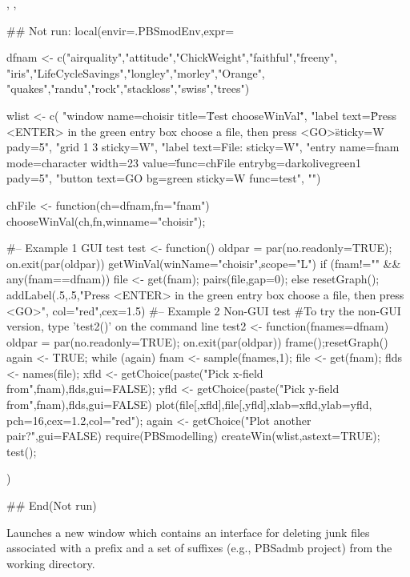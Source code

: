 \documentclass[letterpaper]{book}
\begin{document}
%
\begin{SeeAlso}\relax
 
, , 
\end{SeeAlso}
%
\begin{Examples}
\begin{ExampleCode}
## Not run: 
local(envir=.PBSmodEnv,expr={
dfnam <-
  c("airquality","attitude","ChickWeight","faithful","freeny",
  "iris","LifeCycleSavings","longley","morley","Orange",
  "quakes","randu","rock","stackloss","swiss","trees")

wlist <- c(
  "window name=choisir title=\"Test chooseWinVal\"",
  "label text=\"Press <ENTER> in the green entry box
  \nto choose a file, then press <GO>\" sticky=W pady=5",
  "grid 1 3 sticky=W",
  "label text=File: sticky=W",
  "entry name=fnam mode=character width=23 value=\"\" 
  func=chFile entrybg=darkolivegreen1 pady=5",
  "button text=GO bg=green sticky=W func=test",
  "")

chFile <- function(ch=dfnam,fn="fnam") 
  {chooseWinVal(ch,fn,winname="choisir")};

#-- Example 1 GUI test
test <- function() {
  oldpar = par(no.readonly=TRUE); on.exit(par(oldpar))
  getWinVal(winName="choisir",scope="L")
  if (fnam!="" && any(fnam==dfnam)) {
    file <- get(fnam);
    pairs(file,gap=0); }
  else {
    resetGraph(); 
    addLabel(.5,.5,"Press <ENTER> in the green entry box
    \nto choose a file, then press <GO>", col="red",cex=1.5)
  }
}
#-- Example 2 Non-GUI test
#To try the non-GUI version, type 'test2()' on the command line
test2 <- function(fnames=dfnam) {
  oldpar = par(no.readonly=TRUE); on.exit(par(oldpar))
  frame();resetGraph()
  again <- TRUE;
  while (again) {
    fnam <- sample(fnames,1); file <- get(fnam); 
    flds <- names(file);
    xfld <- getChoice(paste("Pick x-field from",fnam),flds,gui=FALSE);
    yfld <- getChoice(paste("Pick y-field from",fnam),flds,gui=FALSE)
    plot(file[,xfld],file[,yfld],xlab=xfld,ylab=yfld,
      pch=16,cex=1.2,col="red");
    again <- getChoice("Plot another pair?",gui=FALSE)
  }
}
require(PBSmodelling)
createWin(wlist,astext=TRUE); test();
})

## End(Not run)
\end{ExampleCode}
\end{Examples}
%
\begin{Description}\relax
Launches a new window which contains an interface for deleting 
junk files associated with a prefix and a set of suffixes 
(e.g., PBSadmb project) from the working directory.
\end{Description}
\end{document}
